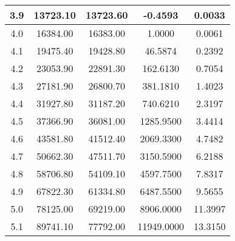 \begin{table}[h!]
\begin{tabular}{|c|c|c|c|c|}
        3.9        & 13723.10       & 13723.60                                            & -0.4593       & 0.0033                \\ \hline
        4.0        & 16384.00       & 16383.00                                            & 1.0000        & 0.0061                \\ \hline
        4.1        & 19475.40       & 19428.80                                            & 46.5874       & 0.2392                \\ \hline
        4.2        & 23053.90       & 22891.30                                            & 162.6130      & 0.7054                \\ \hline
        4.3        & 27181.90       & 26800.70                                            & 381.1810      & 1.4023                \\ \hline
        4.4        & 31927.80       & 31187.20                                            & 740.6210      & 2.3197                \\ \hline
        4.5        & 37366.90       & 36081.00                                            & 1285.9500     & 3.4414                \\ \hline
        4.6        & 43581.80       & 41512.40                                            & 2069.3300     & 4.7482                \\ \hline
        4.7        & 50662.30       & 47511.70                                            & 3150.5900     & 6.2188                \\ \hline
        4.8        & 58706.80       & 54109.10                                            & 4597.7500     & 7.8317                \\ \hline
        4.9        & 67822.30       & 61334.80                                            & 6487.5500     & 9.5655                \\ \hline
        5.0        & 78125.00       & 69219.00                                            & 8906.0000     & 11.3997               \\ \hline
        5.1        & 89741.10       & 77792.00                                            & 11949.0000    & 13.3150               \\ \hline
    \end{tabular}\label{tab:table3}
\end{table}
